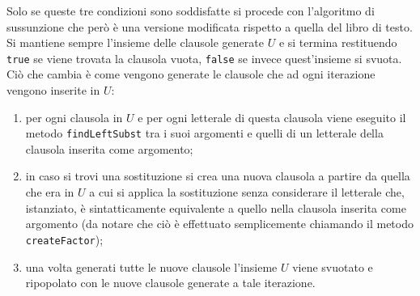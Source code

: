 \documentclass[a4paper,11pt]{article}
\begin{document}
Solo se queste tre condizioni sono soddisfatte si procede con l'algoritmo di sussunzione che però è una versione modificata rispetto a quella del libro di testo. Si mantiene sempre l'insieme delle clausole generate $U$ e si termina restituendo \texttt{true} se viene trovata la clausola vuota, \texttt{false} se invece quest'insieme si svuota. Ciò che cambia è come vengono generate le clausole che ad ogni iterazione vengono inserite in $U$:
\begin{enumerate}
\item per ogni clausola in $U$ e per ogni letterale di questa clausola viene eseguito il metodo \texttt{findLeftSubst} tra i suoi argomenti e quelli di un letterale della clausola inserita come argomento;
\item in caso si trovi una sostituzione si crea una nuova clausola a partire da quella che era in $U$ a cui si applica la sostituzione senza considerare il letterale che, istanziato, è sintatticamente equivalente a quello nella clausola inserita come argomento (da notare che ciò è effettuato semplicemente chiamando il metodo \texttt{createFactor});
\item una volta generati tutte le nuove clausole l'insieme $U$ viene svuotato e ripopolato con le nuove clausole generate a tale iterazione.
\end{enumerate}
\end{document}
